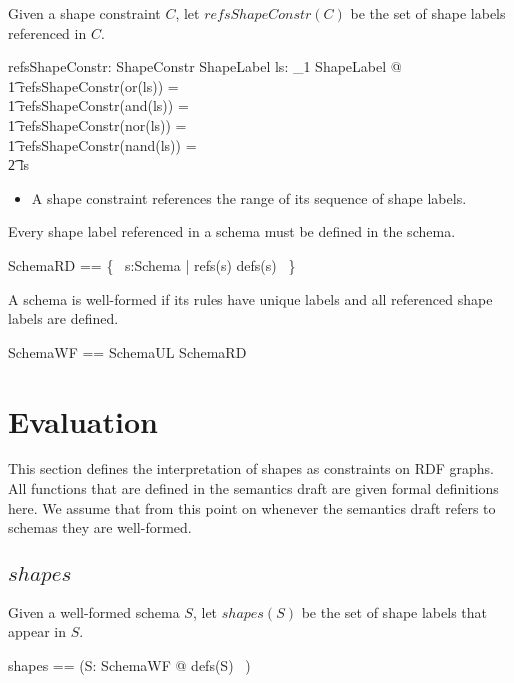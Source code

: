 \documentclass{article}
\begin{document}
Given a shape constraint $C$, let $refsShapeConstr(C)$ be the set of shape labels referenced in $C$.
\begin{axdef}
	refsShapeConstr: ShapeConstr \fun \finset ShapeLabel
\where
	\forall ls: \seq_1 ShapeLabel @ \\
\t1		refsShapeConstr(or(ls)) = \\
\t1		refsShapeConstr(and(ls)) = \\
\t1		refsShapeConstr(nor(ls)) = \\
\t1		refsShapeConstr(nand(ls)) = \\
\t2			\ran ls
\end{axdef}
\begin{itemize}
\item A shape constraint references the range of its sequence of shape labels.
\end{itemize}

Every shape label referenced in a schema must be defined in the schema.
\begin{zed}
	SchemaRD == \{~ s:Schema | refs(s) \subseteq defs(s) ~\}
\end{zed}

A schema is well-formed if its rules have unique labels and all referenced shape labels are defined.
\begin{zed}
	SchemaWF == SchemaUL \cap SchemaRD
\end{zed}

\section{Evaluation}
\label{sec-evaluation}
This section defines the interpretation of shapes as constraints on RDF graphs.
All functions that are defined in the semantics draft are given formal definitions here.
We assume that from this point on whenever the semantics draft refers to schemas they are well-formed.

\subsection{$shapes$}
Given a well-formed schema $S$, let $shapes(S)$ be the set of shape labels that appear in $S$.
\begin{zed}
	shapes == (\lambda S: SchemaWF @ defs(S) ~)
\end{zed}
\end{document}
